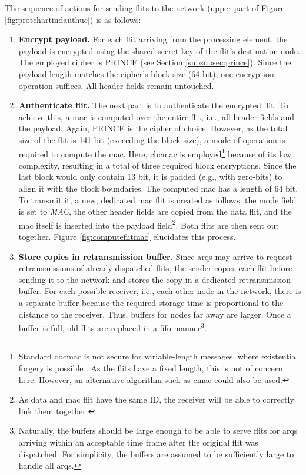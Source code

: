 The sequence of actions for sending flits to the network (upper part of Figure \ref{fig:protchartindauthuc}) is as follows:
\begin{enumerate}
    \item \textbf{Encrypt payload.} For each flit arriving from the processing element, the payload is encrypted using the shared secret key of the
        flit's destination node. The employed cipher is PRINCE (see Section \ref{subsubsec:prince}). Since the payload length matches the cipher's
        block size (64 bit), one encryption operation suffices. All header fields remain untouched.
    \item \textbf{Authenticate flit.} The next part is to authenticate the encrypted flit. To achieve this, a \gls{mac} is computed over the entire
        flit, i.e., all header fields and the payload. Again, PRINCE is the cipher of choice. However, as the total size of the flit is 141 bit
        (exceeding the block size), a mode of operation is required to compute the \gls{mac}. Here, \gls{cbcmac} is employed\footnote{Standard
        \gls{cbcmac} is not secure for variable-length messages, where existential forgery is possible \cite{wikilengthextattack}. As the flits have a
        fixed length, this is not of concern here. However, an alternative algorithm such as \gls{cmac} could also be used.} because of its low
        complexity, resulting in a total of three required block encryptions. Since the last block would only contain 13 bit, it is
        padded (e.g., with zero-bits) to align it with the block boundaries. The computed \gls{mac} has a length of 64 bit. To transmit it, a new, dedicated
        \gls{mac} flit is created as follows: the mode field is set to \textit{MAC}, the other header fields are copied from the data flit, and the
        \gls{mac} itself is inserted into the payload field\footnote{As data and \gls{mac} flit have the same ID, the receiver will be able to
        correctly link them together.}. Both flits are then sent out together. Figure \vref{fig:computeflitmac} elucidates this process.
    \item \textbf{Store copies in retransmission buffer.} Since \glspl{arq} may arrive to request retransmissions of already dispatched flits, the
        sender copies each flit before sending it to the network and stores the copy in a dedicated retransmission buffer. For each possible receiver,
        i.e., each other node in the network,
        there is a separate buffer because the required storage time is proportional to the distance to the receiver. Thus, buffers for nodes far away are
        larger. Once a buffer is full, old flits are replaced in a \gls{fifo} manner\footnote{Naturally, the buffers should be large enough to be
        able to serve flits for \glspl{arq} arriving within an acceptable time frame after the original flit was dispatched. For simplicity, the
        buffers are assumed to be sufficiently large to handle all \glspl{arq}.}.
\end{enumerate}
\vspace{0.5\baselineskip}

